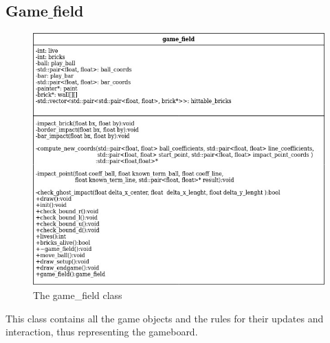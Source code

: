 \documentclass[]{article}
\begin{document}
\subsection{Game$\_$field}
\begin{figure}[h!]
    \centering
    \includegraphics[scale=0.5]{game_field.jpg}
    \caption{The game\_field class}
    \label{fig:game_field diagram }
\end{figure}
This class contains all the game objects and the rules for their updates and interaction, thus representing the gameboard.
\end{document}
